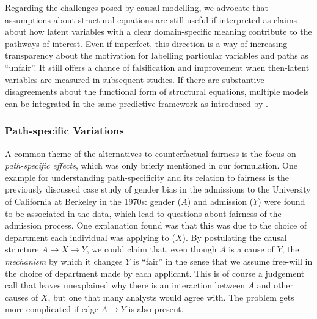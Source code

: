 \documentclass{article}
\begin{document}
Regarding the challenges posed by causal modelling, we advocate that
assumptions about structural equations are still useful if interpreted
as claims about how latent variables with a clear domain-specific
meaning contribute to the pathways of interest. Even if imperfect,
this direction is a way of increasing transparency about the
motivation for labelling particular variables and paths as ``unfair''.
It still offers a chance of falsification and improvement when
then-latent variables are measured in subsequent studies. If there are
substantive disagreements about the functional form of structural
equations, multiple models can be integrated in the same predictive
framework as introduced by \cite{russell:17}.


\subsubsection{Path-specific Variations}
\label{sec:path-spec-vari}
A common theme of the alternatives to counterfactual fairness
\cite{kilbertus:17,ilya:18,elias:18} is the focus on
\emph{path-specific effects}, which was only briefly mentioned in our
formulation. One example for understanding path-specificity and its
relation to fairness is the previously discussed case study of gender bias in
the admissions to the University of California at Berkeley in the
1970s: gender ($A$) and admission ($Y$) were found to be associated in
the data, which lead to questions about fairness of the admission
process. One explanation found was that this was due to the choice of
department each individual was applying to ($X$). By postulating the
causal structure $A \rightarrow X \rightarrow Y$, we could claim that,
even though $A$ is a cause of $Y$, the \emph{mechanism} by which it
changes $Y$ is ``fair'' in the sense that we assume free-will in the
choice of department made by each applicant. This is of course a
judgement call that leaves unexplained why there is an interaction
between $A$ and other causes of $X$, but one that many
analysts would agree with. The problem gets more complicated if edge $A
\rightarrow Y$ is also present.
\end{document}
